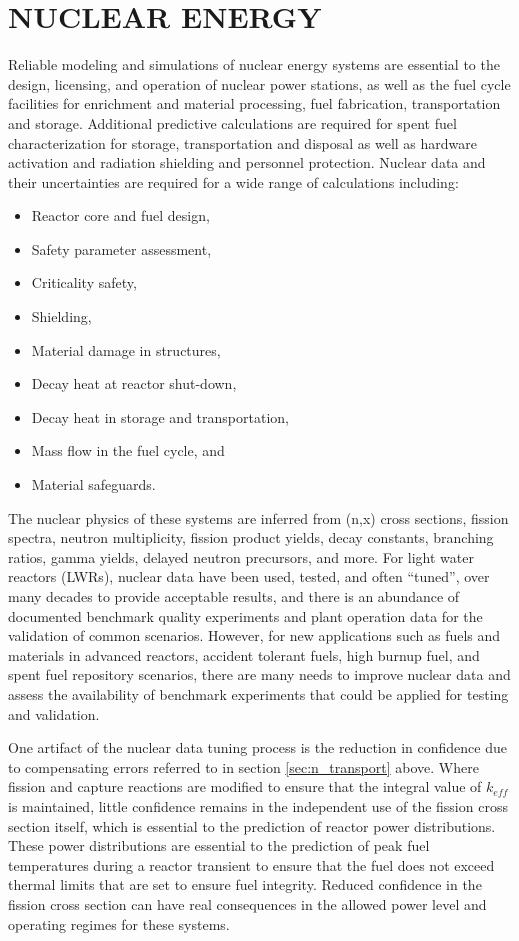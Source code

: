 \documentclass[letterpaper]{ar-1col}
\begin{document}
\section{NUCLEAR ENERGY}

Reliable modeling and simulations of nuclear energy systems are essential to the design, licensing, and operation of nuclear power stations, as well as the fuel cycle facilities for enrichment and material processing, fuel fabrication, transportation and storage.
Additional predictive calculations are required for spent fuel characterization for storage, transportation and disposal as well as hardware activation and radiation shielding and personnel protection.
Nuclear data and their uncertainties are required for a wide range of calculations including:
\begin{itemize}
  \item Reactor core and fuel design,
  \item Safety parameter assessment,
  \item Criticality safety,
  \item Shielding,
  \item Material damage in structures,
  \item Decay heat at reactor shut-down,
  \item Decay heat in storage and transportation,
  \item Mass flow in the fuel cycle, and
  \item Material safeguards.
\end{itemize}

The nuclear physics of these systems are inferred from (n,x) cross sections, fission spectra, neutron multiplicity, fission product yields, decay constants, branching ratios, gamma yields, delayed neutron precursors, and more.
 For light water reactors (LWRs), nuclear data have been used, tested, and often \enquote{tuned}, over many decades to provide acceptable results, and there is an abundance of documented benchmark quality experiments and plant operation data for the validation of common scenarios.
However, for new applications such as fuels and materials in advanced reactors, accident tolerant fuels, high burnup fuel, and spent fuel repository scenarios, there are many needs to improve nuclear data and assess the availability of benchmark experiments that could be applied for testing and validation.

One artifact of the nuclear data tuning process is the reduction in confidence due to compensating errors referred to in section \autoref{sec:n_transport} above.
Where fission and capture reactions are modified to ensure that the integral value of $k_{eff}$ is maintained, little confidence remains in the independent use of the fission cross section itself, which is essential to the prediction of reactor power distributions.
These power distributions are essential to the prediction of peak fuel temperatures during a reactor transient to ensure that the fuel does not exceed thermal limits that are set to ensure fuel integrity.
Reduced confidence in the fission cross section can have real consequences in the allowed power level and operating regimes for these systems.
\end{document}
